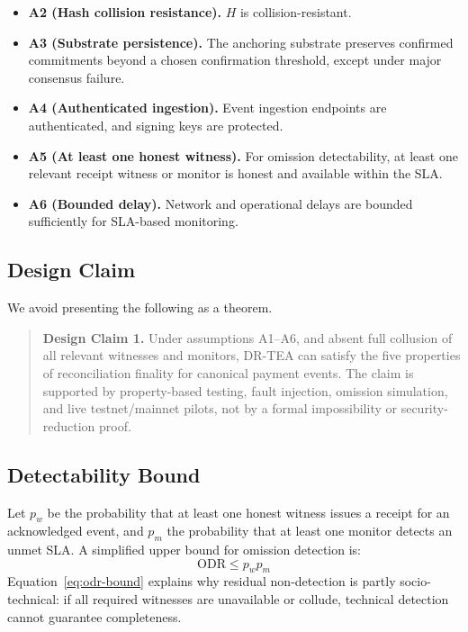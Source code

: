 \documentclass[journal]{IEEEtran}
\begin{document}
\begin{itemize}[nosep,leftmargin=2em]
    \item \textbf{A2 (Hash collision resistance).} $H$ is collision-resistant.
    \item \textbf{A3 (Substrate persistence).} The anchoring substrate preserves confirmed commitments beyond a chosen confirmation threshold, except under major consensus failure.
    \item \textbf{A4 (Authenticated ingestion).} Event ingestion endpoints are authenticated, and signing keys are protected.
    \item \textbf{A5 (At least one honest witness).} For omission detectability, at least one relevant receipt witness or monitor is honest and available within the SLA.
    \item \textbf{A6 (Bounded delay).} Network and operational delays are bounded sufficiently for SLA-based monitoring.
\end{itemize}

\subsection{Design Claim}
We avoid presenting the following as a theorem.

\begin{quote}
\textbf{Design Claim 1.} Under assumptions A1--A6, and absent full collusion of all relevant witnesses and monitors, DR-TEA can satisfy the five properties of reconciliation finality for canonical payment events. The claim is supported by property-based testing, fault injection, omission simulation, and live testnet/mainnet pilots, not by a formal impossibility or security-reduction proof.
\end{quote}

\subsection{Detectability Bound}
Let $p_w$ be the probability that at least one honest witness issues a receipt for an acknowledged event, and $p_m$ the probability that at least one monitor detects an unmet SLA. A simplified upper bound for omission detection is:
\begin{equation}
\mathrm{ODR} \leq p_w p_m
\label{eq:odr-bound}
\end{equation}
Equation~\ref{eq:odr-bound} explains why residual non-detection is partly socio-technical: if all required witnesses are unavailable or collude, technical detection cannot guarantee completeness.
\end{document}
